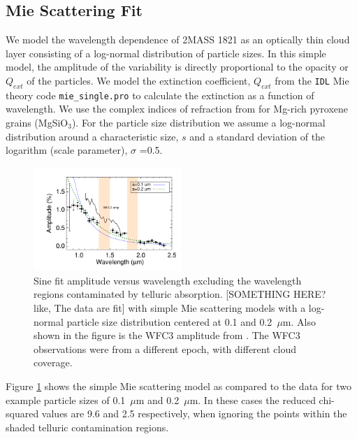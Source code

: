 \documentclass[twocolumn]{aastex6}
\begin{document}
\subsection{Mie Scattering Fit}

We model the wavelength dependence of 2MASS 1821 as an optically thin cloud layer consisting of a log-normal distribution of particle sizes.
In this simple model, the amplitude of the variability is directly proportional to the opacity or $Q_{ext}$ of the particles.
We model the extinction coefficient, $Q_{ext}$ from the \texttt{IDL} Mie theory code \texttt{mie\_single.pro} \citep{grainger04} to calculate the extinction as a function of wavelength.
We use the complex indices of refraction from \citet{dorschner95pyrox} for Mg-rich pyroxene grains (MgSiO$_3$).
For the particle size distribution we assume a log-normal distribution around a characteristic size, $s$ and a standard deviation of the logarithm (scale parameter), $\sigma$ =0.5.

\begin{figure}
\begin{centering}
\includegraphics[width=0.5\textwidth]{amp_vs_wavl_j1821_mie_sc.pdf}
\caption{Sine fit amplitude versus wavelength excluding the wavelength regions contaminated by telluric absorption. [SOMETHING HERE? like, The data are fit] with simple Mie scattering models with a log-normal particle size distribution centered at 0.1 and 0.2~$\mu$m. Also shown in the figure is the WFC3 amplitude from \citet{2015ApJ...798L..13Y}. The WFC3 observations were from a different epoch, with different cloud coverage.}\label{fig:ampspec1821mie}
\end{centering}
\end{figure}

Figure \ref{fig:ampspec1821mie} shows the simple Mie scattering model as compared to the data for two example particle sizes of 0.1~$\mu$m and 0.2~$\mu$m.
In these cases the reduced chi-squared values are 9.6 and 2.5 respectively, when ignoring the points within the shaded telluric contamination regions.
\end{document}
